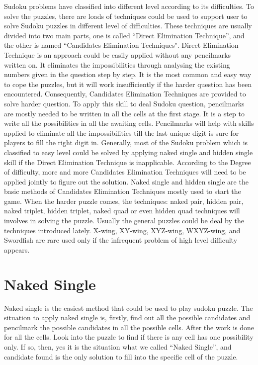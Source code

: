 \documentclass[11pt]{report}
\begin{document}
Sudoku problems have classified into different level according to its difficulties. To solve the puzzles, there are loads of techniques could be used to support user to solve Sudoku puzzles in different level of difficulties.
These techniques are usually divided into two main parts, one is called “Direct Elimination Technique”, and the other is named “Candidates Elimination Techniques".
Direct Elimination Technique is an approach could be easily applied without any pencilmarks written on. It eliminates the impossibilities through analysing the existing numbers given in the question step by step. It is the most common and easy way to cope the puzzles, but it will work insufficiently if the harder question has been encountered. 
Consequently, Candidates Elimination Techniques are provided to solve harder question. To apply this skill to deal Sudoku question, pencilmarks are mostly needed to be written in all the cells at the first stage. It is a step to write all the possibilities in all the awaiting cells. Pencilmarks will help with skills applied to eliminate all the impossibilities till the last unique digit is sure for players to fill the right digit in.
Generally, most of the Sudoku problem which is classified to easy level could be solved by applying naked single and hidden single skill if the Direct Elimination Technique is inapplicable. According to the Degree of difficulty, more and more Candidates Elimination Techniques will need to be applied jointly to figure out the solution. 
Naked single and hidden single are the basic methods of Candidates Elimination Techniques mostly used to start the game. When the harder puzzle comes, the techniques: naked pair, hidden pair, naked triplet, hidden triplet, naked quad or even hidden quad techniques will involves in solving the puzzle. Usually the general puzzles could be deal by the techniques introduced lately. X-wing, XY-wing, XYZ-wing, WXYZ-wing, and Swordfish are rare used only if the infrequent problem of high level difficulty appears. 



\section{Naked Single}
\label{sec:Nakedsingle}

Naked single is the easiest method that could be used to play sudoku puzzle. The situation to apply naked single is, firstly, find out all the possible candidates and pencilmark the possible candidates in all the possible cells. After the work is done for all the cells. Look into the puzzle to find if there is any cell has one possibility only. If so, then, yes it is the situation what we called ``Naked Single'', and candidate found is the only solution to fill into the specific cell of the puzzle.
\end{document}
